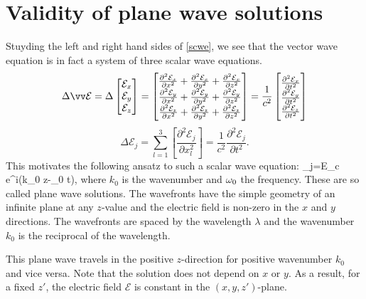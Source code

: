\section{Validity of plane wave solutions}
Stuyding the left and right hand sides of \cref{scwe}, we see that the vector
wave equation is in fact a system of three scalar wave equations.
\begin{equation*}
  \Delta \ev = \Delta
  \begin{bmatrix}
    \mathcal{E}_x\\
    \mathcal{E}_y\\
    \mathcal{E}_z
  \end{bmatrix} =
  \begin{bmatrix}
    \frac{\partial^2\mathcal{E}_x}{\partial x^2}+
    \frac{\partial^2\mathcal{E}_x}{\partial y^2}+
    \frac{\partial^2\mathcal{E}_x}{\partial z^2}\\
    \frac{\partial^2\mathcal{E}_y}{\partial x^2}+
    \frac{\partial^2\mathcal{E}_y}{\partial y^2}+
    \frac{\partial^2\mathcal{E}_y}{\partial z^2}\\
    \frac{\partial^2\mathcal{E}_z}{\partial x^2}+
    \frac{\partial^2\mathcal{E}_z}{\partial y^2}+
    \frac{\partial^2\mathcal{E}_z}{\partial z^2}
  \end{bmatrix} = \frac{1}{c^2}
  \begin{bmatrix}
    \frac{\partial^2\mathcal{E}_x}{\partial t^2}\\
    \frac{\partial^2\mathcal{E}_y}{\partial t^2}\\
    \frac{\partial^2\mathcal{E}_z}{\partial t^2}
  \end{bmatrix}
\end{equation*}
\begin{equation*}
  \Delta \mathcal{E}_j =
  \sum_{l=1}^3\left[\frac{\partial^2\mathcal{E}_j}{\partial x_l^2}\right] =
  \frac{1}{c^2} \frac{\partial^2 \mathcal{E}_j}{\partial t^2}.
\end{equation*}
This motivates the following ansatz to such a scalar wave equation:
\be \label{pws} _j=E_c e^{i(k_0 z-\omega_0 t)},\ee
where $k_0$ is the wavenumber and $\omega_0$ the frequency. These are so 
called plane wave solutions. The wavefronts have the simple
geometry of an infinite plane at any $z$-value and the electric field is
non-zero in the $x$ and $y$ directions. The wavefronts are spaced by the
wavelength $\lambda$ and the wavenumber $k_0$ is the reciprocal of the
wavelength.

This plane wave travels in the positive $z$-direction for positive wavenumber
$k_0$ and vice versa. Note that the solution does not depend on $x$ or $y$. As a
result, for a fixed $z'$, the electric field $\mathcal{E}$ is constant in the
$(x,y,z')$-plane. 

